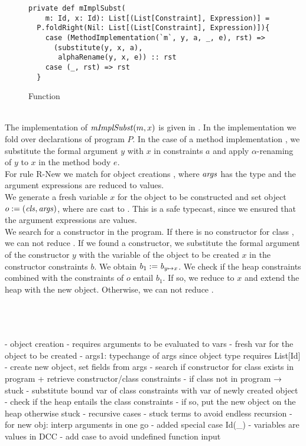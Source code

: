 %
\begin{figure}[h]
\begin{lstlisting}
private def mImplSubst(
    m: Id, x: Id): List[(List[Constraint], Expression)] =
  P.foldRight(Nil: List[(List[Constraint], Expression)]){
    case (MethodImplementation(`m`, y, a, _, e), rst) =>
      (substitute(y, x, a),
       alphaRename(y, x, e)) :: rst
    case (_, rst) => rst
  }
\end{lstlisting}
\caption{Function }
\label{fig:scala-mimpl}
\end{figure}\\
%
The implementation of $\mathit{mImplSubst}(m, x)$ is given in .
In the implementation we fold over declarations of program $P$.
In the case of a method implementation ,
we substitute the formal argument $y$ with $x$ in constraints $a$
and apply $\alpha$-renaming of $y$ to $x$ in the method body $e$.\\
%
For rule R-New we match for object creations ,
where $\mathit{args}$ has the type 
and the argument expressions are reduced to values.\\
We generate a fresh variable $x$ for the object to be constructed
and set object $o := (\mathit{cls}, \mathit{args})$, %
where  are cast to .
This is a safe typecast, since we ensured
that the argument expressions are values.\\
We search for a constructor  in the program.
If there is no constructor for class ,
we can not reduce .
If we found a constructor,
we substitute the formal argument of the constructor $y$
with the variable of the object to be created $x$
in the constructor constraints $b$.
We obtain $b_1 := \mathit{b}_{\mathit{y} \mapsto \mathit{x}}$.
We check if the heap constraints combined
with the constraints of $o$ entail $b_1$.
If so, we reduce  to $x$
and extend the heap with the new object.
Otherwise, we can not reduce .


\quad\\\\\\
- object creation
  - requires arguments to be evaluated to vars
  - fresh var for the object to be created
  - args1: typechange of args since object type requires List[Id]
  - create new object, set fields from args
  - search if constructor for class exists in program
    + retrieve constructor/class constraints
  - if class not in program → stuck
  - substitute bound var of class constraints
    with var of newly created object
  - check if the heap entails the class constraints
  - if so, put the new object on the heap
    otherwise stuck
- recursive cases
  - stuck terms to avoid endless recursion
  - for new obj: interp arguments in one go  
- added special case Id(_)
  - variables are values in DCC
  - add case to avoid undefined function input

